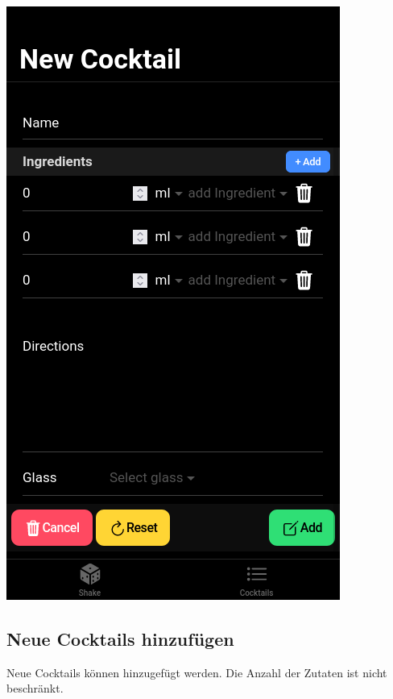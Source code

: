 \documentclass[a4paper, 10pt]{article}
\begin{document}
\begin{multicols}{4}
    \begin{center}
        \includegraphics[width=.8\linewidth]{NewCocktail.png}
    \end{center}
    \columnbreak
    \subsection{Neue Cocktails hinzufügen}
    Neue Cocktails können hinzugefügt werden. Die Anzahl der Zutaten ist nicht beschränkt.
    \columnbreak


\end{multicols}
\end{document}
